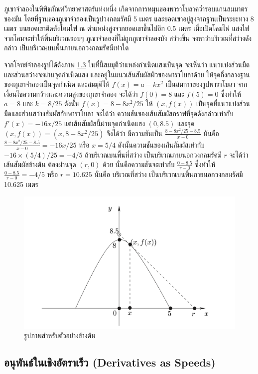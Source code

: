 \documentclass[
]{book}
\begin{document}
ภูเขาจำลองในพิพิธภัณฑ์วิทยาศาสตร์แห่งหนึ่ง
เกิดจากการหมุนของพาราโบลาคว่ำรอบแกนสมมาตรของมัน
โดยที่ฐานของภูเขาจำลองเป็นรูปวงกลมรัศมี 5 เมตร และยอดเขาอยู่สูงจากฐานเป็นระยะทาง 8
เมตร บนยอดเขาติดตั้งโคมไฟ ณ ตำแหน่งสูงจากยอดเขาขึ้นไปอีก 0.5 เมตร เมื่อเปิดโคมไฟ
แสงไฟจากโคมจะทำให้พื้นบริเวณรอบๆ ภูเขาจำลองที่ไม่ถูกภูเขาจำลองบัง สว่างขึ้น
จงหาว่าบริเวณที่สว่างดังกล่าว เป็นบริเวณบนพื้นภายนอกวงกลมรัศมีเท่าใด

จากโจทย์จำลองรูปได้ดังภาพ \hyperref[fig-mountain]{1.3}
ในที่นี้สมมุติว่าแหล่งกำเนิดแสงเป็นจุด จะเห็นว่า แนวแบ่งส่วนมืดและส่วนสว่างจะผ่านจุดกำเนิดแสง
และอยู่ในแนวเส้นสัมผัสผิวของพาราโบลาด้วย ให้จุดกึ่งกลางฐานของภูเขาจำลองเป็นจุดกำเนิด
และสมมุติให้ \(f(x)=a-kx^2\) เป็นสมการของรูปพาราโบลา
จากเงื่อนไขความกว้างและความสูงของภูเขาจำลอง จะได้ว่า \(f(0)=8\) และ \(f(5)=0\)
ซึ่งทำให้ \(a=8\) และ \(k=8/25\) ดังนั้น \(f(x)=8-8x^2/25\) ให้ \((x,f(x))\)
เป็นจุดที่แนวแบ่งส่วนมืดและส่วนสว่างสัมผัสกับพาราโบลา จะได้ว่า
ความชันของเส้นสัมผัสกราฟที่จุดดังกล่าวเท่ากับ \(f'(x)=-16x/25\)
แต่เส้นสัมผัสนี้ผ่านจุดกำเนิดแสง \((0,8.5)\) และจุด \((x,f(x))=(x,8-8x^2/25)\)
จึงได้ว่า มีความชันเป็น \(\displaystyle\frac{8-8x^2/25-8.5}{x-0}\) นั่นคือ
\(\displaystyle\frac{8-8x^2/25-8.5}{x-0}=-16x/25\) หรือ \(x=5/4\)
ดังนั้นความชันของเส้นสัมผัสเท่ากับ \(-16\times(5/4)/25=-4/5\) ถ้าบริเวณบนพื้นที่สว่าง
เป็นบริเวณภายนอกวงกลมรัศมี \(r\) จะได้ว่า เส้นสัมผัสข้างต้น ต้องผ่านจุด \((r,0)\) ด้วย
นั่นคือความชันจะเท่ากับ \(\displaystyle\frac{0-8.5}{r-0}\) ซึ่งทำให้
\(\displaystyle\frac{0-8.5}{r-0}=-4/5\) หรือ \(r=10.625\) นั่นคือ บริเวณที่สว่าง
เป็นบริเวณบนพื้นภายนอกวงกลมรัศมี 10.625 เมตร

\begin{figure}

{\centering \includegraphics[width=0.5\linewidth]{images/fig-derivative-3} 

}

\caption{รูปภาพสำหรับตัวอย่างข้างต้น}\label{fig:fig-derivative-3}
\end{figure}

\subsection{อนุพันธ์ในเชิงอัตราเร็ว (Derivatives as
Speeds)}\label{uxe2duxe19uxe1euxe19uxe18uxe43uxe19uxe40uxe0auxe07uxe2duxe15uxe23uxe32uxe40uxe23uxe27-derivatives-as-speeds}
\end{document}
